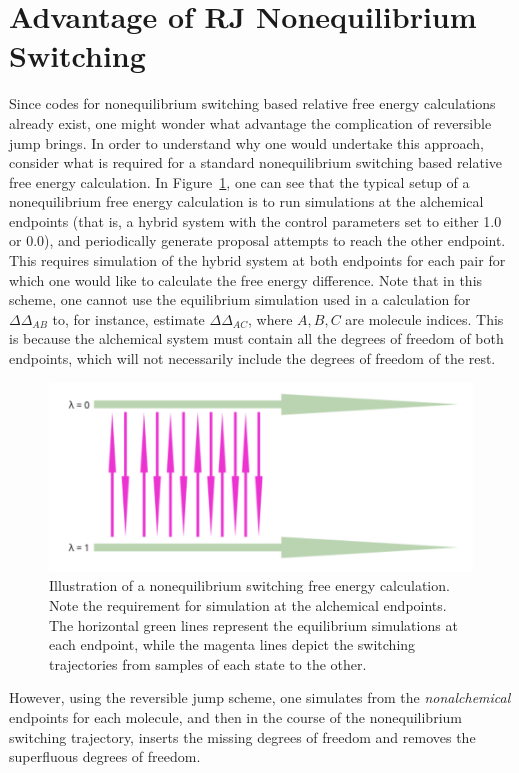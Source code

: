 \section{Advantage of RJ Nonequilibrium Switching}
%
Since codes for nonequilibrium switching based relative free energy calculations already exist, one might wonder what advantage the complication of reversible jump brings.
%
In order to understand why one would undertake this approach, consider what is required for a standard nonequilibrium switching based relative free energy calculation.
%
In Figure~\ref{fig:trad_neq}, one can see that the typical setup of a nonequilibrium free energy calculation is to run simulations at the alchemical endpoints (that is, a hybrid system with the control parameters set to either 1.0 or 0.0), and periodically generate proposal attempts to reach the other endpoint.
%
This requires simulation of the hybrid system at both endpoints for each pair for which one would like to calculate the free energy difference.
%
Note that in this scheme, one cannot use the equilibrium simulation used in a calculation for $\Delta\Delta_{AB}$ to, for instance, estimate $\Delta\Delta_{AC}$, where $A,B,C$ are molecule indices.
%
This is because the alchemical system must contain all the degrees of freedom of both endpoints, which will not necessarily include the degrees of freedom of the rest.
%
\begin{figure}
    \centering
    \includegraphics[width=1.0\textwidth]{new_neqdiagram.png}
    \caption{Illustration of a nonequilibrium switching free energy calculation. Note the requirement for simulation at the alchemical endpoints. The horizontal green lines represent the equilibrium simulations at each endpoint, while the magenta lines depict the switching trajectories from samples of each state to the other.}
    \label{fig:trad_neq}
\end{figure}
%
However, using the reversible jump scheme, one simulates from the \emph{nonalchemical} endpoints for each molecule, and then in the course of the nonequilibrium switching trajectory, inserts the missing degrees of freedom and removes the superfluous degrees of freedom.
